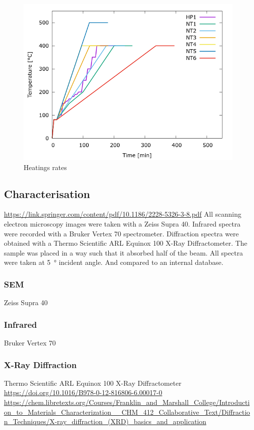\documentclass[a4paper]{article}
\begin{document}
\begin{figure}
	\centering
	\includegraphics[width=.7\textwidth]{../Data/Graphs/hp1.png}
	\caption{Heatings rates}
	\label{fig:heat}
\end{figure}

\subsection{Characterisation}
\url{https://link.springer.com/content/pdf/10.1186/2228-5326-3-8.pdf}
All scanning electron microscopy images were taken with a Zeiss Supra 40. 
%
Infrared spectra were recorded with a Bruker Vertex 70 spectrometer. 
%
Diffraction spectra were obtained with a Thermo Scientific ARL Equinox 100 X-Ray Diffractometer. 
The sample was placed in a way such that it absorbed half of the beam. 
All spectra were taken at \SI{5}{\degree} incident angle. 
And compared to an internal database.
\subsubsection{SEM}
Zeiss Supra 40
\subsubsection{Infrared}
Bruker Vertex 70
\subsubsection{X-Ray Diffraction}
Thermo Scientific ARL Equinox 100 X-Ray Diffractometer\\
\url{https://doi.org/10.1016/B978-0-12-816806-6.00017-0}\\
\url{https://chem.libretexts.org/Courses/Franklin_and_Marshall_College/Introduction_to_Materials_Characterization__CHM_412_Collaborative_Text/Diffraction_Techniques/X-ray_diffraction_(XRD)_basics_and_application}\\
\end{document}
